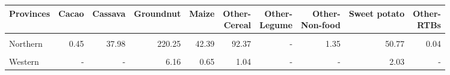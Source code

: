 \begin{table}[!h]
\centering\begingroup\fontsize{7}{9}\selectfont

\begin{tabular}{>{\raggedright\arraybackslash}p{1.8cm}rrrrrrrrr}
\toprule
Provinces & Cacao & Cassava & Groundnut & Maize & \makecell{Other-\\Cereal} & \makecell{Other-\\Legume} & \makecell{Other-\\Non-food} & Sweet potato & \makecell{Other-\\RTBs}\\
\midrule
\cellcolor{gray!10}{Eastern} & \cellcolor{gray!10}{0.07} & \cellcolor{gray!10}{1.84} & \cellcolor{gray!10}{55.70} & \cellcolor{gray!10}{19.33} & \cellcolor{gray!10}{19.77} & \cellcolor{gray!10}{0.21} & \cellcolor{gray!10}{7.50} & \cellcolor{gray!10}{24.16} & \cellcolor{gray!10}{-}\\
Northern & 0.45 & 37.98 & 220.25 & 42.39 & 92.37 & - & 1.35 & 50.77 & 0.04\\
\cellcolor{gray!10}{Southern} & \cellcolor{gray!10}{0.20} & \cellcolor{gray!10}{9.34} & \cellcolor{gray!10}{87.98} & \cellcolor{gray!10}{20.65} & \cellcolor{gray!10}{32.47} & \cellcolor{gray!10}{0.02} & \cellcolor{gray!10}{1.35} & \cellcolor{gray!10}{23.72} & \cellcolor{gray!10}{-}\\
Western & - & - & 6.16 & 0.65 & 1.04 & - & - & 2.03 & -\\
\bottomrule
\end{tabular}
\endgroup{}
\end{table}
